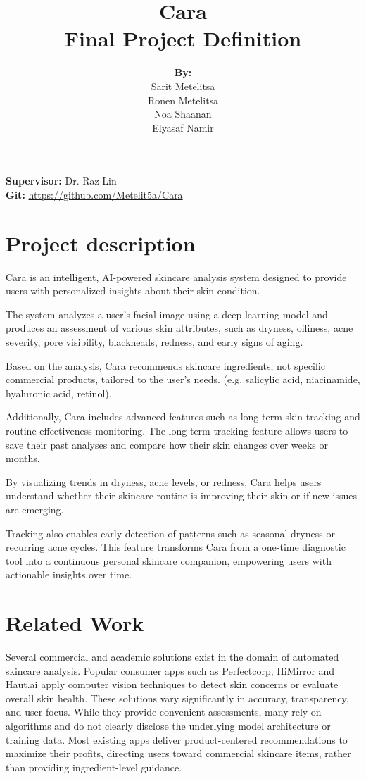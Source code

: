 \documentclass[12pt,a4paper]{article}
\title{\textbf{Cara} \\ \Large Final Project Definition}
\author{\textbf{By:} \\ Sarit Metelitsa \\ Ronen Metelitsa \\ Noa Shaanan \\ Elyasaf Namir}
\date{}
\begin{document}
\maketitle
\begin{center}
\textbf{Supervisor:} Dr. Raz Lin \\
\textbf{Git:} \url{https://github.com/Metelit5a/Cara}
\end{center}

\section{Project description}
Cara is an intelligent, AI-powered skincare analysis system designed to provide users with personalized insights about their skin condition.

The system analyzes a user's facial image using a deep learning model and produces an assessment of various skin attributes, such as dryness, oiliness, acne severity, pore visibility, blackheads, redness, and early signs of aging.

Based on the analysis, Cara recommends skincare ingredients, not specific commercial products, tailored to the user's needs. (e.g. salicylic acid, niacinamide, hyaluronic acid, retinol).

Additionally, Cara includes advanced features such as long-term skin tracking and routine effectiveness monitoring. The long-term tracking feature allows users to save their past analyses and compare how their skin changes over weeks or months.

By visualizing trends in dryness, acne levels, or redness, Cara helps users understand whether their skincare routine is improving their skin or if new issues are emerging.

Tracking also enables early detection of patterns such as seasonal dryness or recurring acne cycles. This feature transforms Cara from a one-time diagnostic tool into a continuous personal skincare companion, empowering users with actionable insights over time.

\section{Related Work}
Several commercial and academic solutions exist in the domain of automated skincare analysis. Popular consumer apps such as Perfectcorp, HiMirror and Haut.ai apply computer vision techniques to detect skin concerns or evaluate overall skin health. These solutions vary significantly in accuracy, transparency, and user focus. While they provide convenient assessments, many rely on algorithms and do not clearly disclose the underlying model architecture or training data. Most existing apps deliver product-centered recommendations to maximize their profits, directing users toward commercial skincare items, rather than providing ingredient-level guidance.
\end{document}
